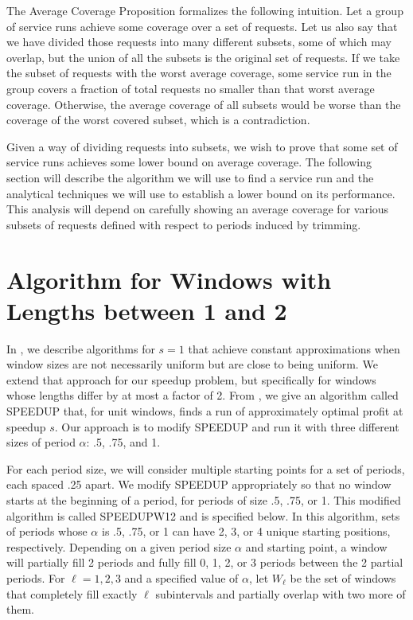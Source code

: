 \documentclass[11pt]{article}
\begin{document}
The Average Coverage Proposition formalizes the following intuition.  Let a group of service runs achieve some coverage over a set of requests.  Let us also say that we have divided those requests into many different subsets, some of which may overlap, but the union of all the subsets is the original set of requests.  If we take the subset of requests with the worst average coverage, some service run in the group covers a fraction of total requests no smaller than that worst average coverage.  Otherwise, the average coverage of all subsets would be worse than the coverage of the worst covered subset, which is a contradiction.

Given a way of dividing requests into subsets, we wish to prove that some set of service runs achieves some lower bound on average coverage.  The following section will describe the algorithm we will use to find a service run and the analytical techniques we will use to establish a lower bound on its performance.  This analysis will depend on carefully showing an average coverage for various subsets of requests defined with respect to periods induced by trimming. 


\section{Algorithm for Windows with Lengths between 1 and 2}
\label{section:lengths12}

In \cite{Frederickson6}, we describe algorithms for $s = 1$ that achieve constant approximations when window sizes are not necessarily uniform
but are close to being uniform.
We extend that approach for our speedup problem,
but specifically for windows whose lengths differ by at most a factor of 2.  From \cite{Frederickson5}, we give an algorithm called SPEEDUP that, for unit windows, finds a run of approximately optimal profit at speedup $s$.
Our approach is to modify SPEEDUP  and run it with three different sizes of period $\alpha$: .5, .75, and 1.

For each period size, we will consider multiple starting points for a set of periods, each spaced .25 apart.  
We modify SPEEDUP appropriately so that no window starts at the beginning of a period, for periods of size .5, .75, or 1.  This modified algorithm is called SPEEDUPW12 and is specified below.
In this algorithm, sets of periods whose $\alpha$ is .5, .75, or 1 can have 2, 3, or 4 unique starting positions, respectively.  
Depending on a given period size $\alpha$ and starting point, a window will partially fill 2 periods 
and fully fill 0, 1, 2, or 3 periods between the 2 partial periods.  For $\ell = 1, 2, 3$ and a specified value of $\alpha$, let $W_\ell$ be the set of windows
that completely fill exactly $\ell$ subintervals and partially overlap with two more of them.
\end{document}
